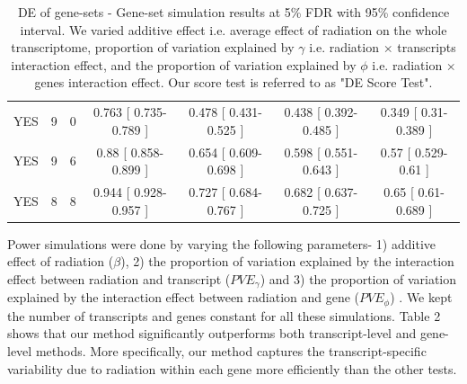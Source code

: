 \documentclass[hidelinks,11pt]{article}
\begin{document}
\begin{table}[!ht]
\begin{center}
{\begin{tabular}{| c | c | c | c | c | c | c |}
YES & 9 & 0 & 0.763 [ 0.735-0.789 ] &  0.478 [ 0.431-0.525 ] &  0.438 [ 0.392-0.485 ] &  0.349 [ 0.31-0.389 ] \\
YES & 9 & 6 & 0.88 [ 0.858-0.899 ] &  0.654 [ 0.609-0.698 ] &  0.598 [ 0.551-0.643 ] &  0.57 [ 0.529-0.61 ] \\
YES & 8 & 8 & 0.944 [ 0.928-0.957 ] &  0.727 [ 0.684-0.767 ] &  0.682 [ 0.637-0.725 ] &  0.65 [ 0.61-0.689 ] \\
\hline \hline
\end{tabular}
}
\label{table:design}
\end{center}
\caption{DE of gene-sets - Gene-set simulation results at 5\% FDR with 95\% confidence interval. We varied additive effect i.e. average effect of radiation on the whole transcriptome, proportion of variation explained by $\gamma$ i.e. radiation $\times$ transcripts interaction effect, and the proportion of variation explained by $\phi$ i.e. radiation $\times$ genes interaction effect. Our score test is referred to as "DE Score Test".}
\end{table}

Power simulations were done by varying the following parameters- 1) additive effect of radiation ($\beta$), 2) the proportion of variation explained by the interaction effect between radiation and transcript ($PVE_\gamma$) and 3) the proportion of variation explained by the interaction effect between radiation and gene ($PVE_\phi$) . We kept the number of transcripts and genes constant for all these simulations. Table 2 shows that our method significantly outperforms both transcript-level and gene-level methods. More specifically, our method captures the transcript-specific variability due to radiation within each gene more efficiently than the other tests. 
\end{document}
